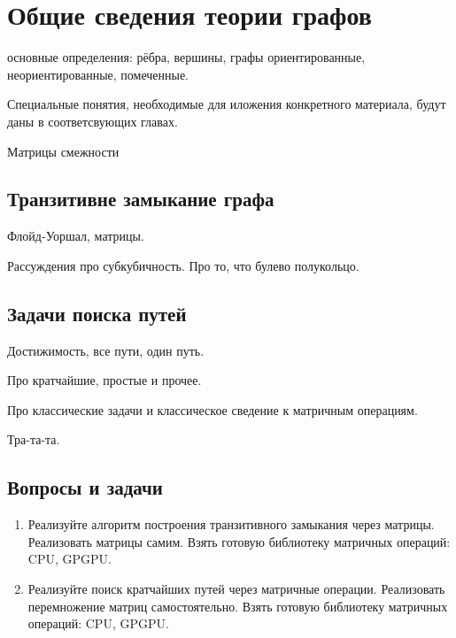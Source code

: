 \section{Общие сведения теории графов}

основные определения: рёбра, вершины, графы ориентированные, неориентированные, помеченные.

Специальные понятия, необходимые для иложения конкретного материала, будут даны в соответсвующих главах.

Матрицы смежности

\subsection{Транзитивне замыкание графа}

Флойд-Уоршал, матрицы.

Рассуждения про субкубичность.
Про то, что булево полукольцо.


\subsection{Задачи поиска путей}

Достижимость, все пути, один путь.

Про кратчайшие, простые и прочее.

Про классические задачи и классическое сведение к матричным операциям.

Тра-та-та.

\subsection{Вопросы и задачи}
\begin{enumerate}
  \item Реализуйте алгоритм построения транзитивного замыкания через матрицы.
  Реализовать матрицы самим.
  Взять готовую библиотеку матричных операций: CPU, GPGPU.
  \item Реализуйте поиск кратчайших путей через матричные операции.
  Реализовать перемножение матриц самостоятельно.
  Взять готовую библиотеку матричных операций: CPU, GPGPU.
\end{enumerate}
